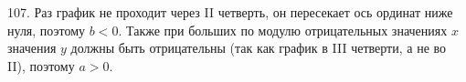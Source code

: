 107. Раз график не проходит через II четверть, он пересекает ось ординат ниже нуля, поэтому $b<0.$ Также при больших по модулю отрицательных значениях $x$ значения $y$ должны быть отрицательны (так как график в III четверти, а не во II), поэтому $a>0.$\\
